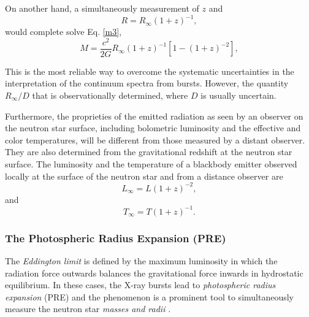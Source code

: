 {\quad

On another hand, a simultaneously measurement of $z$ and 
\begin{equation*}
R = R_{\infty} (1+z)^{-1},
\end{equation*}
would complete solve  Eq. \ref{m3},
\begin{equation*}
M= \frac{c^2}{2G} R_{\infty} (1+z)^{-1}[1-(1+z)^{-2}],
\end{equation*}

\quad

This is the most reliable way to overcome the systematic uncertainties in the interpretation of the continuum spectra from bursts. However,  the quantity $R_{\infty}/D$ that is observationally determined, where $D$ is usually uncertain.


\quad

Furthermore, the proprieties of the emitted radiation as seen by an observer on the neutron star surface, including bolometric luminosity and the effective and color temperatures, will be different from those measured by a distant observer. They are also  determined from the gravitational redshift at the neutron star surface. The luminosity and the temperature of a blackbody emitter observed locally at the surface of the neutron star and from a distance observer are 
\begin{equation*}
L_{\infty} = L (1+z)^{-2},
\end{equation*}
and
\begin{equation*}
T_{\infty} = T (1+z)^{-1}.
\end{equation*}

\quad 





\subsubsection*{The Photospheric Radius Expansion (PRE)}

The {\it Eddington limit} is defined by  the maximum luminosity in which the radiation force outwards balances the gravitational force inwards in hydrostatic equilibrium.  In these cases, the X-ray bursts lead to  {\it photospheric radius expansion} (PRE)  and the phenomenon is a  prominent tool to  simultaneously measure the neutron star {\it masses and radii} \cite{VAN90} \cite{DAM90}. 

\quad

}
